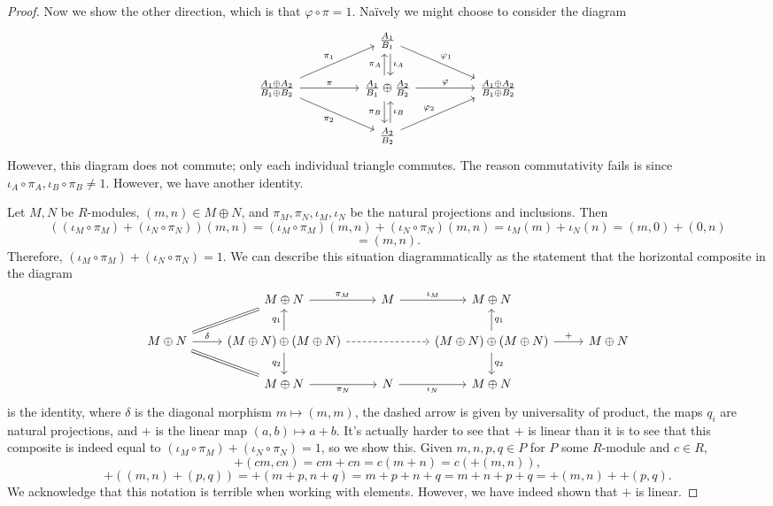 \documentclass[11pt, letterpaper]{article}
\begin{document}
\begin{proof}
Now we show the other direction, which is that $\varphi \circ \pi =1$. Na\"ively we might choose to consider the diagram
\[\begin{tikzcd}
	&& {\frac{A_1}{B_1}} \\
	{\frac{A_1\oplus A_2}{B_1\oplus B_2}} && {\frac{A_1}{B_1}\oplus\frac{A_2}{B_2}} && {\frac{A_1\oplus A_2}{B_1\oplus B_2}} \\
	&& {\frac{A_2}{B_2}}
	\arrow["{\iota_A}", shift left, from=1-3, to=2-3]
	\arrow["{\varphi_1}", from=1-3, to=2-5]
	\arrow["{\pi_1}", from=2-1, to=1-3]
	\arrow["\pi", from=2-1, to=2-3]
	\arrow["{\pi_2}"', from=2-1, to=3-3]
	\arrow["{\pi_A}", shift left, from=2-3, to=1-3]
	\arrow["\varphi", from=2-3, to=2-5]
	\arrow["{\pi_B}"', shift right, from=2-3, to=3-3]
	\arrow["{\iota_B}"', shift right, from=3-3, to=2-3]
	\arrow["{\varphi_2}", from=3-3, to=2-5]
\end{tikzcd}\]
However, this diagram does not commute; only each individual triangle commutes. The reason commutativity fails is since $\iota _A\circ \pi _A,\iota _B \circ \pi _B \neq 1$. However, we have another identity.

Let $M,N$ be $R$-modules, $(m,n)\in M\oplus N$, and $\pi _M,\pi _N,\iota _M,\iota _N$ be the natural projections and inclusions. Then
\[
	((\iota _M \circ \pi _M)+(\iota _N\circ \pi _N))(m,n) = (\iota _M\circ \pi _M)(m,n)+(\iota _N\circ \pi _N)(m,n)=\iota _M(m)+\iota _N(n)=(m,0)+(0,n)
\]
\[
	=(m,n)
.\]
Therefore, $(\iota _M\circ \pi _M)+(\iota _N\circ \pi _N)=1$. We can describe this situation diagrammatically as the statement that the horizontal composite in the diagram
\[\begin{tikzcd}
	& {M\oplus N} & M & {M\oplus N} \\
	{M\oplus N} & {\left(M\oplus N\right)\oplus \left(M\oplus N\right)} && {\left(M\oplus N\right)\oplus \left(M\oplus N\right)} & {M\oplus N} \\
	& {M\oplus N} & N & {M\oplus N}
	\arrow["{\pi_M}", from=1-2, to=1-3]
	\arrow[equals, from=2-1, to=1-2]
	\arrow[equals, from=2-1, to=3-2]
	\arrow["{\iota_M}", from=1-3, to=1-4]
	\arrow["\delta", from=2-1, to=2-2]
	\arrow["{q_1}", from=2-2, to=1-2]
	\arrow[dashed, from=2-2, to=2-4]
	\arrow["{q_2}"', from=2-2, to=3-2]
	\arrow["{q_1}"', from=2-4, to=1-4]
	\arrow["{+}", from=2-4, to=2-5]
	\arrow["{q_2}", from=2-4, to=3-4]
	\arrow["{\pi_N}"', from=3-2, to=3-3]
	\arrow["{\iota_N}"', from=3-3, to=3-4]
\end{tikzcd}\]
is the identity, where $\delta $ is the diagonal morphism $m\mapsto (m,m)$, the dashed arrow is given by universality of product, the maps $q_i$ are natural projections, and $+$ is the linear map $(a,b)\mapsto a+b$. It's actually harder to see that $+$ is linear than it is to see that this composite is indeed equal to $(\iota _M\circ \pi _M)+(\iota _N\circ \pi _N)=1$, so we show this. Given $m,n,p,q\in P$ for $P$ some $R$-module and $c\in R$,
\[
	+(cm,cn) = cm+cn = c(m+n) = c(+(m,n)),
\]
\[
	+((m,n)+(p,q))=+(m+p,n+q)=m+p+n+q=m+n+p+q=+(m,n)++(p,q)	
.\]
We acknowledge that this notation is terrible when working with elements. However, we have indeed shown that $+$ is linear.


\end{proof}
\end{document}
